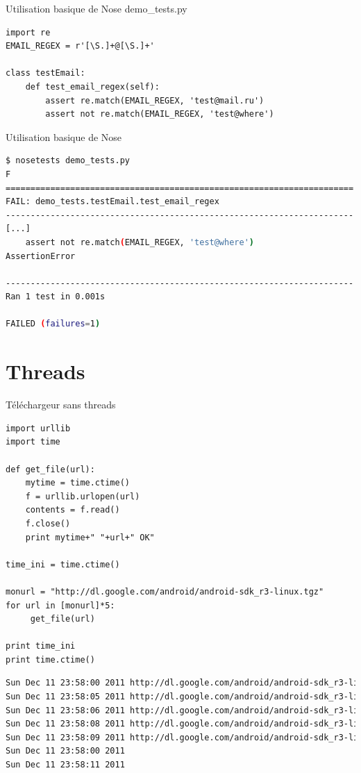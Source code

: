 \documentclass{beamer}
\begin{document}
\begin{frame}[fragile]{Utilisation basique de Nose}
demo\_tests.py
\begin{lstlisting}
import re
EMAIL_REGEX = r'[\S.]+@[\S.]+'

class testEmail:
    def test_email_regex(self):
        assert re.match(EMAIL_REGEX, 'test@mail.ru')
        assert not re.match(EMAIL_REGEX, 'test@where')
\end{lstlisting}
\end{frame}

\begin{frame}[fragile]{Utilisation basique de Nose}
\begin{lstlisting}[language=bash]
$ nosetests demo_tests.py
F
======================================================================
FAIL: demo_tests.testEmail.test_email_regex
----------------------------------------------------------------------
[...]
    assert not re.match(EMAIL_REGEX, 'test@where')
AssertionError

----------------------------------------------------------------------
Ran 1 test in 0.001s

FAILED (failures=1)
\end{lstlisting}
\end{frame}

\section{Threads}

\begin{frame}[fragile]{Téléchargeur sans threads}
\begin{lstlisting}[basicstyle=\tiny, multicols=2]
import urllib
import time

def get_file(url):
    mytime = time.ctime()
    f = urllib.urlopen(url)
    contents = f.read()
    f.close()
    print mytime+" "+url+" OK"

time_ini = time.ctime()

monurl = "http://dl.google.com/android/android-sdk_r3-linux.tgz"
for url in [monurl]*5:
     get_file(url)

print time_ini
print time.ctime()
\end{lstlisting}
\vspace{-8px}
\begin{lstlisting}[language=bash, basicstyle=\tiny]
Sun Dec 11 23:58:00 2011 http://dl.google.com/android/android-sdk_r3-linux.tgz OK
Sun Dec 11 23:58:05 2011 http://dl.google.com/android/android-sdk_r3-linux.tgz OK
Sun Dec 11 23:58:06 2011 http://dl.google.com/android/android-sdk_r3-linux.tgz OK
Sun Dec 11 23:58:08 2011 http://dl.google.com/android/android-sdk_r3-linux.tgz OK
Sun Dec 11 23:58:09 2011 http://dl.google.com/android/android-sdk_r3-linux.tgz OK
Sun Dec 11 23:58:00 2011
Sun Dec 11 23:58:11 2011
\end{lstlisting}
\end{frame}
\end{document}
